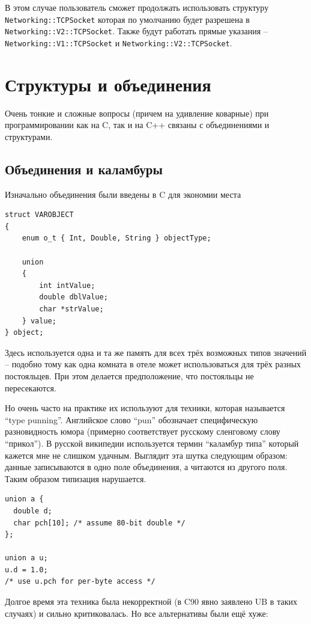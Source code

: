\documentclass[a4paper,12pt,oneside]{book}
\begin{document}
В этом случае пользователь сможет продолжать использовать структуру \lstinline!Networking::TCPSocket! которая по умолчанию будет разрешена в \lstinline!Networking::V2::TCPSocket!. Также будут работать прямые указания -- \lstinline!Networking::V1::TCPSocket! и \lstinline!Networking::V2::TCPSocket!.

\pagebreak
\section{Структуры и объединения}

Очень тонкие и сложные вопросы (причем на удивление коварные) при программировании как на C, так и на C++ связаны с объединениями и структурами.

\subsection{Объединения и каламбуры}

Изначально объединения были введены в C для экономии места

\begin{lstlisting}
struct VAROBJECT
{
    enum o_t { Int, Double, String } objectType;

    union
    {
        int intValue;
        double dblValue;
        char *strValue;
    } value;
} object;
\end{lstlisting}

Здесь используется одна и та же память для всех трёх возможных типов значений -- подобно тому как одна комната в отеле может использоваться для трёх разных постояльцев. При этом делается предположение, что постояльцы не пересекаются.

Но очень часто на практике их используют для техники, которая называется ``type punning''. Английское слово ``pun'' обозначает специфическую разновидность юмора (примерно соответствует русскому сленговому слову ``прикол''). В русской википедии используется термин ``каламбур типа'' который кажется мне не слишком удачным. Выглядит эта шутка следующим образом: данные записываются в одно поле объединения, а читаются из другого поля. Таким образом типизация нарушается.

\begin{lstlisting}
union a {
  double d;
  char pch[10]; /* assume 80-bit double */
};

union a u;
u.d = 1.0;
/* use u.pch for per-byte access */
\end{lstlisting}

Долгое время эта техника была некорректной (в C90 явно заявлено UB в таких случаях) и сильно критиковалась. Но все альтернативы были ещё хуже:
\end{document}
